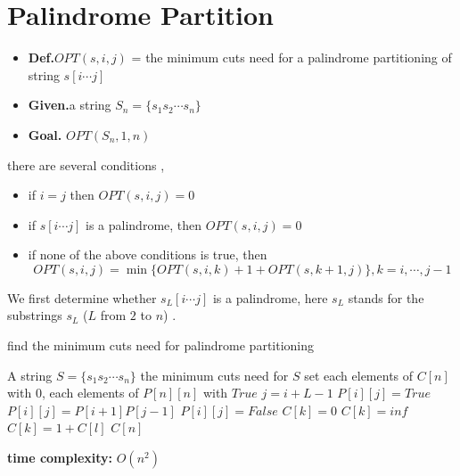 \section{Palindrome Partition}
\begin{itemize}
	\item \textbf{Def.}\qquad$OPT(s,i,j)$ = the minimum cuts need for a palindrome partitioning of string $s[i \cdots j]$
	\item \textbf{Given.}\quad a string $S_n =\{s_1s_2\cdots s_n\}$
	\item \textbf{Goal.} \quad$OPT(S_n, 1, n)$  
\end{itemize}
there are several conditions , 
\begin{itemize}
	\item if $i = j$ then $OPT(s,i,j) = 0$
	\item if $s[i\cdots j]$ is a palindrome, then $OPT(s,i,j) = 0$
	\item if none of the above conditions is true, then
	\[
		OPT(s, i, j) = \min\{	
			OPT(s, i, k) + 1 + OPT(s, k+1, j)
		\}	, k = i, \cdots, j-1
	\]
\end{itemize}

We first determine whether $s_L[i\cdots j]$ is a palindrome, here $s_L$ stands for the substrings $s_L$ ($L$ from $2$ to $n$) .
\begin{algorithm}[H]
	\caption{find the minimum cuts need for palindrome partitioning }
	\begin{algorithmic}[1]
		\Require A string $S = \{s_1s_2\cdots s_n\}$
		\Ensure the minimum cuts need for $S$ 
			\State set each elements of $C[n]$ with $0$, 
			each elements of $P[n][n]$ with $True$  
					\State $j = i + L- 1$
						\State $P[i][j] = True$
						\State $P[i][j] = P[i+1]P[j-1]$
					\Else
						\State $P[i][j] = False$ 
					\EndIf 
				\EndFor 
			\EndFor 
				 \State $C[k] = 0$
			 \Else
				 \State $C[k] = inf$
						  \State $C[k] = 1 + C[l]$
					 \EndIf 
				 \EndFor 
			 \EndIf 
		 \EndFor 
		 \State \Return $C[n]$
		 \EndFunction 
	\end{algorithmic}	
\end{algorithm} 
\textbf{time complexity:} 
$O(n^2)$